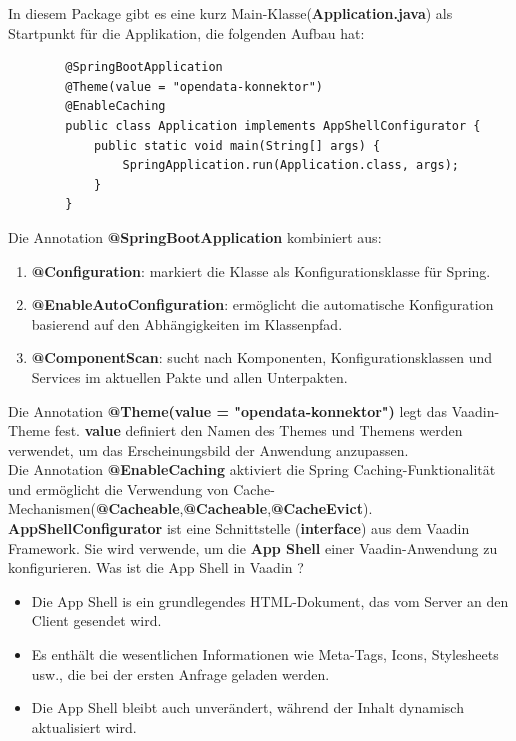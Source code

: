 \documentclass[a4paper,12pt]{scrreprt}
\begin{document}
	In diesem Package gibt es eine kurz Main-Klasse(\textbf{Application.java}) als Startpunkt für die Applikation, die folgenden Aufbau hat: \\
	\begin{lstlisting}
		@SpringBootApplication
		@Theme(value = "opendata-konnektor")
		@EnableCaching
		public class Application implements AppShellConfigurator {
			public static void main(String[] args) {
				SpringApplication.run(Application.class, args);
			}
		}
	\end{lstlisting}
	Die Annotation \textbf{@SpringBootApplication} kombiniert aus:
	\begin{enumerate}
		\item  \textbf{@Configuration}: markiert die Klasse als Konfigurationsklasse für Spring.
		\item  \textbf{@EnableAutoConfiguration}: ermöglicht die automatische Konfiguration basierend auf den Abhängigkeiten im Klassenpfad.
		\item  \textbf{@ComponentScan}: sucht nach Komponenten, Konfigurationsklassen und Services im aktuellen Pakte und allen Unterpakten.
	\end{enumerate}
	Die Annotation \textbf{@Theme(value = "opendata-konnektor")} legt das Vaadin-Theme fest. \textbf{value} definiert den Namen des Themes und Themens werden verwendet, um das Erscheinungsbild der Anwendung anzupassen.\\
	Die Annotation \textbf{@EnableCaching} aktiviert die Spring Caching-Funktionalität und ermöglicht die Verwendung von Cache-Mechanismen(\textbf{@Cacheable},\textbf{@Cacheable},\textbf{@CacheEvict}).\\
	\textbf{AppShellConfigurator} ist eine Schnittstelle (\textbf{interface}) aus dem Vaadin Framework. Sie wird verwende, um die \textbf{App Shell} einer Vaadin-Anwendung zu konfigurieren. Was ist die App Shell in Vaadin ?
	\begin{itemize}
		\item Die App Shell is ein grundlegendes HTML-Dokument, das vom Server an den Client gesendet wird.
		\item Es enthält die wesentlichen Informationen wie Meta-Tags, Icons, Stylesheets usw., die bei der ersten Anfrage geladen werden.
		\item Die App Shell bleibt auch unverändert, während der Inhalt dynamisch aktualisiert wird.
	\end{itemize}
	
\end{document}
